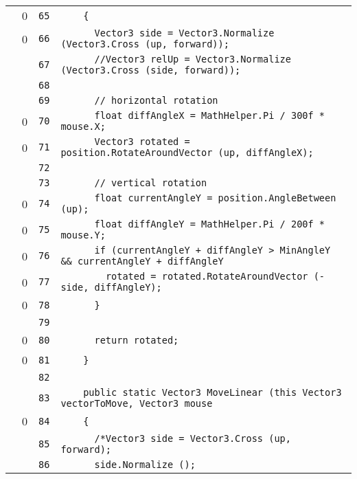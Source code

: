 \documentclass[a4paper,10pt]{article}
\begin{document}
\begin{longtable}[l]{lrrl}
\cellcolor{red} & 0 & \verb~65~ & \verb~    {~\\
\cellcolor{red} & 0 & \verb~66~ & \verb~      Vector3 side = Vector3.Normalize (Vector3.Cross (up, forward));~\\
\cellcolor{gray} &  & \verb~67~ & \verb~      //Vector3 relUp = Vector3.Normalize (Vector3.Cross (side, forward));~\\
\cellcolor{gray} &  & \verb~68~ & \verb~~\\
\cellcolor{gray} &  & \verb~69~ & \verb~      // horizontal rotation~\\
\cellcolor{red} & 0 & \verb~70~ & \verb~      float diffAngleX = MathHelper.Pi / 300f * mouse.X;~\\
\cellcolor{red} & 0 & \verb~71~ & \verb~      Vector3 rotated = position.RotateAroundVector (up, diffAngleX);~\\
\cellcolor{gray} &  & \verb~72~ & \verb~~\\
\cellcolor{gray} &  & \verb~73~ & \verb~      // vertical rotation~\\
\cellcolor{red} & 0 & \verb~74~ & \verb~      float currentAngleY = position.AngleBetween (up);~\\
\cellcolor{red} & 0 & \verb~75~ & \verb~      float diffAngleY = MathHelper.Pi / 200f * mouse.Y;~\\
\cellcolor{red} & 0 & \verb~76~ & \verb~      if (currentAngleY + diffAngleY > MinAngleY && currentAngleY + diffAngleY~\\
\cellcolor{red} & 0 & \verb~77~ & \verb~        rotated = rotated.RotateAroundVector (-side, diffAngleY);~\\
\cellcolor{red} & 0 & \verb~78~ & \verb~      }~\\
\cellcolor{gray} &  & \verb~79~ & \verb~~\\
\cellcolor{red} & 0 & \verb~80~ & \verb~      return rotated;~\\
\cellcolor{red} & 0 & \verb~81~ & \verb~    }~\\
\cellcolor{gray} &  & \verb~82~ & \verb~~\\
\cellcolor{gray} &  & \verb~83~ & \verb~    public static Vector3 MoveLinear (this Vector3 vectorToMove, Vector3 mouse~\\
\cellcolor{red} & 0 & \verb~84~ & \verb~    {~\\
\cellcolor{gray} &  & \verb~85~ & \verb~      /*Vector3 side = Vector3.Cross (up, forward);~\\
\cellcolor{gray} &  & \verb~86~ & \verb~      side.Normalize ();~\\

\end{longtable}
\end{document}
